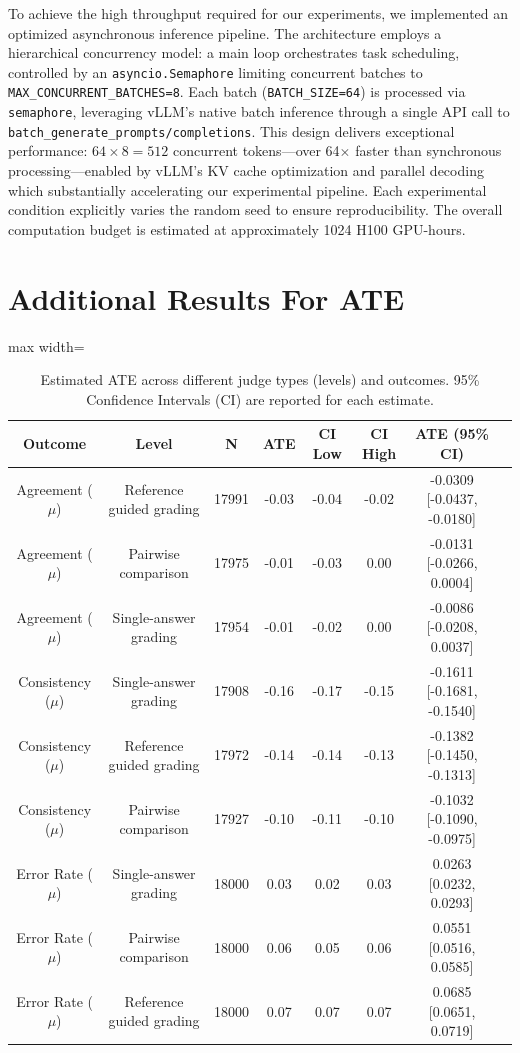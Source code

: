 \documentclass[11pt]{article}
\begin{document}
To achieve the high throughput required for our experiments, we implemented an optimized asynchronous inference pipeline. The architecture employs a hierarchical concurrency model: a main loop orchestrates task scheduling, controlled by an \texttt{asyncio.Semaphore} limiting concurrent batches to \texttt{MAX\_CONCURRENT\_BATCHES=8}. Each batch (\texttt{BATCH\_SIZE=64}) is processed via \texttt{semaphore}, leveraging vLLM's native batch inference through a single API call to \texttt{batch\_generate\_prompts/completions}. This design delivers exceptional performance: $64 \times 8 = 512$ concurrent tokens---over 64$\times$ faster than synchronous processing---enabled by vLLM's KV cache optimization and parallel decoding which substantially accelerating our experimental pipeline. Each experimental condition explicitly varies the random seed to ensure reproducibility. The overall computation budget is estimated at approximately 1024 H100 GPU-hours.


\section{Additional Results For ATE}
\label{sec:appendix_ate}

\begin{table}[htbp]
\centering
\begin{adjustbox}{max width=\textwidth}
\begin{tabular}{cccccccc}
\toprule
Outcome & Level & N & ATE & CI Low & CI High & ATE (95\% CI) \\
\midrule
Agreement ($\mu$)   & Reference guided grading & 17991 & -0.03 & -0.04 & -0.02 & -0.0309 [-0.0437, -0.0180] \\
Agreement ($\mu$)   & Pairwise comparison         & 17975 & -0.01 & -0.03 &  0.00 & -0.0131 [-0.0266, 0.0004] \\
Agreement ($\mu$)   & Single-answer grading    & 17954 & -0.01 & -0.02 &  0.00 & -0.0086 [-0.0208, 0.0037] \\
Consistency ($\mu$) & Single-answer grading    & 17908 & -0.16 & -0.17 & -0.15 & -0.1611 [-0.1681, -0.1540] \\
Consistency ($\mu$) & Reference guided grading & 17972 & -0.14 & -0.14 & -0.13 & -0.1382 [-0.1450, -0.1313] \\
Consistency ($\mu$) & Pairwise comparison          & 17927 & -0.10 & -0.11 & -0.10 & -0.1032 [-0.1090, -0.0975] \\
Error Rate ($\mu$)  & Single-answer grading    & 18000 &  0.03 &  0.02 &  0.03 &  0.0263 [0.0232, 0.0293] \\
Error Rate ($\mu$)  & Pairwise comparison          & 18000 &  0.06 &  0.05 &  0.06 &  0.0551 [0.0516, 0.0585] \\
Error Rate ($\mu$)  & Reference guided grading & 18000 &  0.07 &  0.07 &  0.07 &  0.0685 [0.0651, 0.0719] \\
\bottomrule
\end{tabular}
\end{adjustbox}
\caption{Estimated ATE across different judge types (levels) and outcomes. 95\% Confidence Intervals (CI) are reported for each estimate.}
\label{tab:ate_judge_type}
\end{table}
\end{document}
